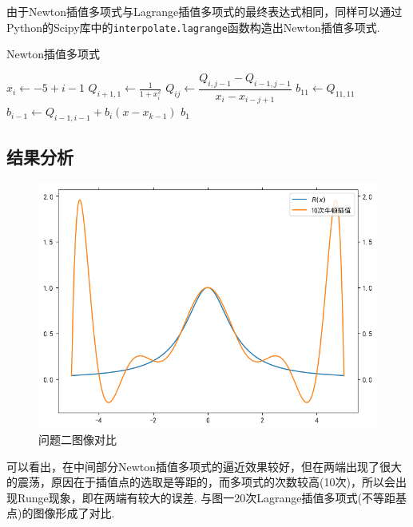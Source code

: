 \documentclass[UTF8,ctexart,a4paper,11pt,openany]{article}
\theoremstyle{definition}
\newcommand\e{\leftarrow}
\begin{document}
    由于Newton插值多项式与Lagrange插值多项式的最终表达式相同，同样可以通过Python的Scipy库中的\texttt{interpolate.lagrange}函数构造出Newton插值多项式.
    \begin{algorithm}[H]
        \caption{Newton插值多项式}
        \begin{algorithmic}[1]
                \State $x_i\e -5+ i -1$
                \State $Q_{i+1,1}\e \frac{1}{1+x_i^2}$
            \EndFor
                        \State $Q_{ij}\e \dfrac{Q_{i,j-1}-Q_{i-1,j-1}}{x_i-x_{i-j+1}}$
                    \EndIf
                \EndFor
            \EndFor
            \State $b_{11}\e Q_{11,11}$
                \State $b_{i-1}\e Q_{i-1,i-1}+b_i(x-x_{k-1})$
            \EndFor 
            \State \Return $b_1$ 
        \end{algorithmic}
    \end{algorithm}
    \subsection{结果分析}%
    \begin{figure}[H]
        \centering
        \includegraphics{pics/P3.2.png}
        \caption{问题二图像对比}
        \label{graph:1}
        \end{figure}
    可以看出，在中间部分Newton插值多项式的逼近效果较好，但在两端出现了很大的震荡，原因在于插值点的选取是等距的，而多项式的次数较高(10次)，所以会出现Runge现象，即在两端有较大的误差. 与图一20次Lagrange插值多项式(不等距基点)的图像形成了对比.
\end{document}
